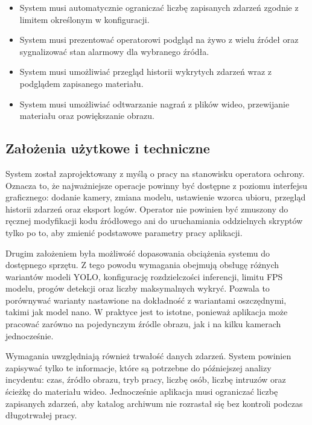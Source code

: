 \begin{itemize}
\item System musi automatycznie ograniczać liczbę zapisanych zdarzeń zgodnie z limitem określonym w konfiguracji.
\item System musi prezentować operatorowi podgląd na żywo z wielu źródeł oraz sygnalizować stan alarmowy dla wybranego źródła.
\item System musi umożliwiać przegląd historii wykrytych zdarzeń wraz z podglądem zapisanego materiału.
\item System musi umożliwiać odtwarzanie nagrań z plików wideo, przewijanie materiału oraz powiększanie obrazu.
\end{itemize}

\subsection{Założenia użytkowe i techniczne}

System został zaprojektowany z myślą o pracy na stanowisku operatora ochrony. Oznacza to, że najważniejsze operacje powinny być dostępne z poziomu interfejsu graficznego: dodanie kamery, zmiana modelu, ustawienie wzorca ubioru, przegląd historii zdarzeń oraz eksport logów. Operator nie powinien być zmuszony do ręcznej modyfikacji kodu źródłowego ani do uruchamiania oddzielnych skryptów tylko po to, aby zmienić podstawowe parametry pracy aplikacji.

Drugim założeniem była możliwość dopasowania obciążenia systemu do dostępnego sprzętu. Z tego powodu wymagania obejmują obsługę różnych wariantów modeli YOLO, konfigurację rozdzielczości inferencji, limitu FPS modelu, progów detekcji oraz liczby maksymalnych wykryć. Pozwala to porównywać warianty nastawione na dokładność z wariantami oszczędnymi, takimi jak model nano. W praktyce jest to istotne, ponieważ aplikacja może pracować zarówno na pojedynczym źródle obrazu, jak i na kilku kamerach jednocześnie.

Wymagania uwzględniają również trwałość danych zdarzeń. System powinien zapisywać tylko te informacje, które są potrzebne do późniejszej analizy incydentu: czas, źródło obrazu, tryb pracy, liczbę osób, liczbę intruzów oraz ścieżkę do materiału wideo. Jednocześnie aplikacja musi ograniczać liczbę zapisanych zdarzeń, aby katalog archiwum nie rozrastał się bez kontroli podczas długotrwałej pracy.

